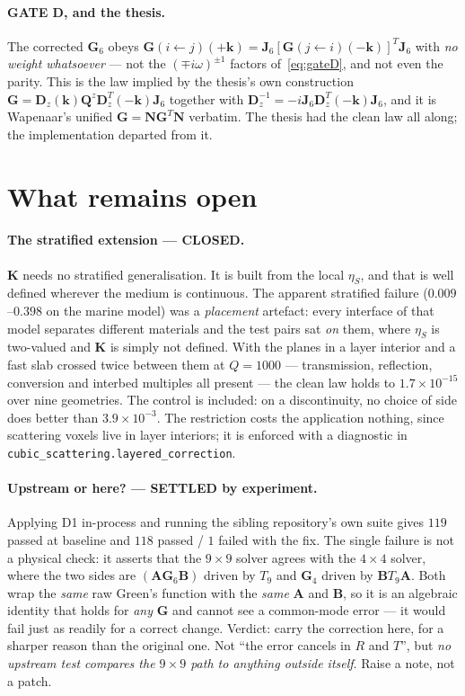 \documentclass[11pt,a4paper]{article}
\newcommand{\bJ}{\mathbf{J}}
\newcommand{\bQ}{\mathbf{Q}}
\newcommand{\bA}{\mathbf{A}}
\newcommand{\bB}{\mathbf{B}}
\newcommand{\bG}{\mathbf{G}}
\newcommand{\bD}{\mathbf{D}}
\newcommand{\bK}{\mathbf{K}}
\newcommand{\bN}{\mathbf{N}}
\begin{document}
\paragraph{GATE D, and the thesis.}  The corrected $\bG_6$ obeys
$\bG(i\!\leftarrow\!j)(+\mathbf{k}) =
\bJ_6[\bG(j\!\leftarrow\!i)(-\mathbf{k})]^{T}\bJ_6$ with \emph{no weight
whatsoever} --- not the $(\mp i\omega)^{\pm1}$ factors of~\eqref{eq:gateD}, and
not even the parity.  This is the law implied by the thesis's own construction
$\bG = \bD_z(\mathbf{k})\bQ^{z}\bD_z^{T}(-\mathbf{k})\bJ_6$ together with
$\bD_z^{-1} = -i\bJ_6\bD_z^{T}(-\mathbf{k})\bJ_6$, and it is Wapenaar's
unified $\bG = \bN\bG^{T}\bN$ verbatim.  The thesis had the clean law all
along; the implementation departed from it.

\section{What remains open}

\paragraph{The stratified extension --- CLOSED.}  $\bK$ needs no stratified
generalisation.  It is built from the local $\eta_S$, and that is well defined
wherever the medium is continuous.  The apparent stratified failure
($0.009$--$0.398$ on the marine model) was a \emph{placement} artefact: every
interface of that model separates different materials and the test pairs sat
\emph{on} them, where $\eta_S$ is two-valued and $\bK$ is simply not defined.
With the planes in a layer interior and a fast slab crossed twice between them
at $Q=1000$ --- transmission, reflection, conversion and interbed multiples all
present --- the clean law holds to $1.7\times10^{-15}$ over nine geometries.
The control is included: on a discontinuity, no choice of side does better than
$3.9\times10^{-3}$.  The restriction costs the application nothing, since
scattering voxels live in layer interiors; it is enforced with a diagnostic in
\texttt{cubic\_scattering.layered\_correction}.

\paragraph{Upstream or here? --- SETTLED by experiment.}  Applying D1 in-process
and running the sibling repository's own suite gives $119$ passed at baseline
and $118$ passed / $1$ failed with the fix.  The single failure is not a
physical check: it asserts that the $9\times9$ solver agrees with the $4\times4$
solver, where the two sides are $(\bA\bG_6\bB)$ driven by $T_{9}$ and
$\bG_{4}$ driven by $\bB T_{9}\bA$.  Both wrap the \emph{same} raw Green's
function with the \emph{same} $\bA$ and $\bB$, so it is an algebraic identity
that holds for \emph{any} $\bG$ and cannot see a common-mode error --- it would
fail just as readily for a correct change.  Verdict: carry the correction here,
for a sharper reason than the original one.  Not ``the error cancels in $R$ and
$T$'', but \emph{no upstream test compares the $9\times9$ path to anything
outside itself}.  Raise a note, not a patch.
\end{document}
